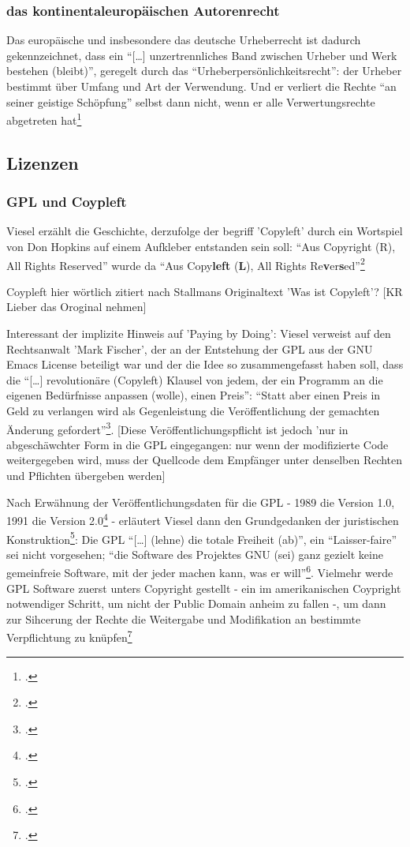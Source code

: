 \documentclass[DIV=calc,BCOR=5mm,11pt,headings=small,oneside,abstract=true, toc=bib]{scrartcl}
\begin{document}
\subsubsection{das kontinentaleuropäischen Autorenrecht}

Das europäische und insbesondere das deutsche Urheberrecht ist dadurch
gekennzeichnet, dass ein \enquote{[\ldots] unzertrennliches Band zwischen Urheber
und Werk bestehen (bleibt)}, geregelt durch das
\enquote{Urheberpersönlichkeitsrecht}: der Urheber bestimmt über Umfang und
Art der Verwendung. Und er verliert die Rechte \enquote{an seiner geistige
Schöpfung} selbst dann nicht, wenn er alle Verwertungsrechte abgetreten
hat\footcite[vgl.][48]{Viesel2006a}

\subsection{Lizenzen}

\subsubsection{GPL und Coypleft}

Viesel erzählt die Geschichte, derzufolge der begriff 'Copyleft' durch ein
Wortspiel von Don Hopkins auf einem Aufkleber entstanden sein soll: \enquote{Aus
Copyright (R), All Rights Reserved} wurde da \enquote{Aus
Copy\textbf{left} (\textbf{L}), All Rights
Re\textbf{v}er\textbf{s}ed}\footcite[vgl.][60]{Viesel2006a}

Coypleft hier wörtlich zitiert nach Stallmans Originaltext 'Was ist Copyleft'?
[KR Lieber das Oroginal nehmen]

Interessant der implizite Hinweis auf 'Paying by Doing': Viesel verweist auf den
Rechtsanwalt 'Mark Fischer', der an der Entstehung der GPL aus der GNU Emacs
License beteiligt war und der die Idee so zusammengefasst haben soll, dass die
\enquote{[\ldots] revolutionäre (Copyleft) Klausel von jedem, der ein Programm an
die eigenen Bedürfnisse anpassen (wolle), einen Preis}: \enquote{Statt aber
einen Preis in Geld zu verlangen wird als Gegenleistung die Veröffentlichung der
gemachten Änderung gefordert}\footcite[vgl.][61]{Viesel2006a}.
[Diese Veröffentlichungspflicht ist jedoch 'nur in abgeschäwchter Form in die
GPL eingegangen: nur wenn der modifizierte Code weitergegeben wird, muss der
Quellcode dem Empfänger unter denselben Rechten und Pflichten übergeben werden]

Nach Erwähnung der Veröffentlichungsdaten für die GPL - 1989 die Version
1.0, 1991 die Version 2.0\footcite[vgl.][61]{Viesel2006a} - erläutert Viesel
dann den Grundgedanken der juristischen
Konstruktion\footcite[vgl.][62ff]{Viesel2006a}: Die GPL \enquote{[\ldots]
(lehne) die totale Freiheit (ab)}, ein \enquote{Laisser-faire} sei
nicht vorgesehen; \enquote{die Software des Projektes GNU (sei) ganz
gezielt keine gemeinfreie Software, mit der jeder machen kann, was er
will}\footcite[vgl.][63]{Viesel2006a}. Vielmehr werde GPL Software zuerst
unters Copyright gestellt - ein im amerikanischen Coypright notwendiger Schritt,
um nicht der Public Domain anheim zu fallen -, um dann zur Sihcerung der Rechte
die Weitergabe und Modifikation an bestimmte Verpflichtung zu
knüpfen\footcite[vgl.][62f]{Viesel2006a}
\end{document}
